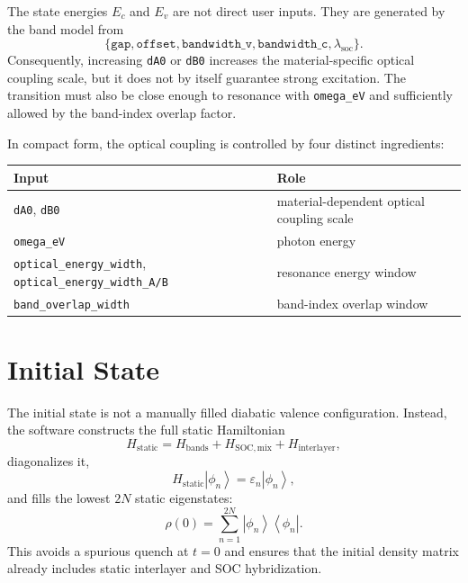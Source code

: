 \documentclass[11pt,a4paper]{article}
\newcommand{\ket}[1]{\left|#1\right\rangle}
\newcommand{\bra}[1]{\left\langle #1\right|}
\begin{document}
The state energies $E_c$ and $E_v$ are not direct user inputs.  They are generated by the band model from
\begin{equation}
\{\texttt{gap},\texttt{offset},\texttt{bandwidth\_v},\texttt{bandwidth\_c},\lambda_{\mathrm{soc}}\}.
\end{equation}
Consequently, increasing \texttt{dA0} or \texttt{dB0} increases the material-specific optical coupling scale, but it does not by itself guarantee strong excitation.  The transition must also be close enough to resonance with \texttt{omega\_eV} and sufficiently allowed by the band-index overlap factor.

In compact form, the optical coupling is controlled by four distinct ingredients:
\begin{center}
\begin{tabular}{ll}
\toprule
Input & Role \\
\midrule
\texttt{dA0}, \texttt{dB0} & material-dependent optical coupling scale \\
\texttt{omega\_eV} & photon energy \\
\texttt{optical\_energy\_width}, \texttt{optical\_energy\_width\_A/B} & resonance energy window \\
\texttt{band\_overlap\_width} & band-index overlap window \\
\bottomrule
\end{tabular}
\end{center}

\section{Initial State}

The initial state is not a manually filled diabatic valence configuration.  Instead, the software constructs the full static Hamiltonian
\begin{equation}
H_{\mathrm{static}}=H_{\mathrm{bands}}+H_{\mathrm{SOC,mix}}+H_{\mathrm{interlayer}},
\end{equation}
diagonalizes it,
\begin{equation}
H_{\mathrm{static}}\ket{\phi_n}=\varepsilon_n\ket{\phi_n},
\end{equation}
and fills the lowest $2N$ static eigenstates:
\begin{equation}
\rho(0)=\sum_{n=1}^{2N}\ket{\phi_n}\bra{\phi_n}.
\end{equation}
This avoids a spurious quench at $t=0$ and ensures that the initial density matrix already includes static interlayer and SOC hybridization.
\end{document}
